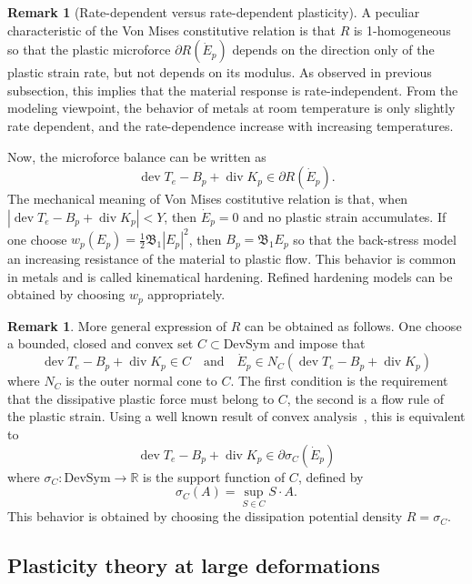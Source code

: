 \documentclass[a4paper,10pt,oneside]{amsbook}
\numberwithin{section}{chapter}
\numberwithin{equation}{chapter}
\theoremstyle{definition}
\newtheorem{rmk}[prop]{Remark}
\DeclareMathOperator{\dev}{dev}
\DeclareMathOperator{\diver}{div}
\begin{document}
\begin{rmk}[Rate-dependent versus rate-dependent plasticity]
A peculiar characteristic of the Von Mises constitutive relation is that $R$ is 1-homogeneous so that the plastic microforce $\partial R(\dot E_p)$ depends on the direction only of the plastic strain rate, but not depends on its modulus. As observed in previous subsection, this implies that the material response is rate-independent. From the modeling viewpoint, the behavior of metals at room temperature is only slightly rate dependent, and the rate-dependence increase with increasing temperatures.
\end{rmk}
Now, the microforce balance can be written as
\[
\dev T_e-B_p+\diver K_p\in\partial R(\dot E_p).
\]
The mechanical meaning of Von Mises costitutive relation is that, when $|\dev T_e-B_p+\diver K_p|<Y$, then $\dot E_p=0$ and no plastic strain accumulates. If one choose $w_p(E_p)=\frac{1}{2}\mathfrak{B}_1|E_p|^2$, then $B_p=\mathfrak{B}_1E_p$ so that the back-stress model an increasing resistance of the material to plastic flow. This behavior is common in metals and is called kinematical hardening. Refined hardening models can be obtained by choosing $w_p$ appropriately.
\begin{rmk}
\label{rmk:flow-rule}
More general expression of $R$ can be obtained as follows. One choose a bounded, closed and convex set $C\subset\text{DevSym}$ and impose that
\[
\dev T_e-B_p+\diver K_p\in C\quad\text{and}\quad\dot E_p\in N_C(\dev T_e-B_p+\diver K_p)
\]
where $N_C$ is the outer normal cone to $C$. The first condition is the requirement that the dissipative plastic force must belong to $C$, the second is a flow rule of the plastic strain. Using a well known result of convex analysis~\cite[Corollary 5.2]{ekeland-temam}, this is equivalent to
\[
\dev T_e-B_p+\diver K_p\in\partial\sigma_C(\dot E_p)
\]
where $\sigma_C\colon\text{DevSym}\to\mathbb{R}$ is the support function of $C$, defined by
\[
\sigma_C(A)=\sup_{S\in C}S\cdot A.
\]
This behavior is obtained by choosing the dissipation potential density $R=\sigma_C$.
\end{rmk}

\subsection{Plasticity theory at large deformations}
\end{document}
